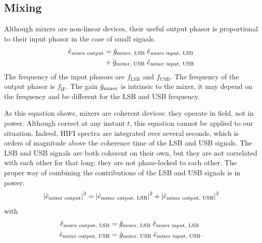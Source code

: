 
\subsection{Mixing}
Although mixers are non-linear devices, their useful output phasor is proportional to their input phasor in the case of small signals.
\begin{equation}
    \begin{aligned}
    \hat{e}_\text{mixer output}
    &=
    \hat{g}_\text{mixer, LSB} \;
    \hat{e}_\text{mixer input, LSB} \\
    &+
    \hat{g}_\text{mixer, USB} \;
    \hat{e}_\text{mixer input, USB}
    \end{aligned}
\end{equation}
The frequency of the input phasors are $f_\text{LSB}$ and $f_\text{USB}$.
The frequency of the output phasor is $f_\text{IF}$.
The gain $\hat{g}_\text{mixer}$ is intrinsic to the mixer, it may depend on the frequency and be different for the LSB and USB frequency.

As this equation shows, mixers are coherent devices: they operate in field, not in power.
Although correct at any instant $t$, this equation cannot be applied to our situation.
Indeed, HIFI spectra are integrated over several seconds, which is orders of magnitude above the coherence time of the LSB and USB signals.
The LSB and USB signals are both coherent on their own, but they are not correlated with each other for that long: they are not phase-locked to each other.
The proper way of combining the contributions of the LSB and USB signals is in power:
\begin{equation}
    \abs{\cp{e}_\text{mixer output}}^2
    =
    \abs{\cp{e}_\text{mixer output, LSB}}^2
    +
    \abs{\cp{e}_\text{mixer output, USB}}^2
\end{equation}
with
\begin{align}
    \hat{e}_\text{mixer output, LSB}
    &=
    \hat{g}_\text{mixer, LSB}
    \;
    \hat{e}_\text{mixer input, LSB}
    \\
    \hat{e}_\text{mixer output, USB}
    &=
    \hat{g}_\text{mixer, USB}
    \;
    \hat{e}_\text{mixer input, USB}
    \text{.}
\end{align}

